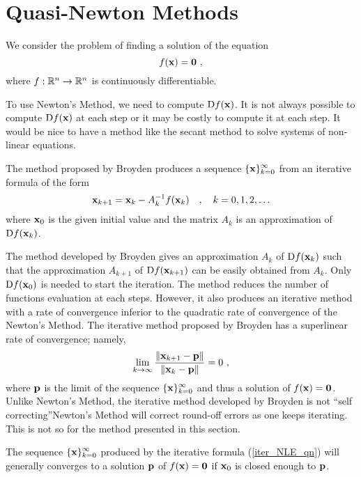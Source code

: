\section{Quasi-Newton Methods}

We consider the problem of finding a solution of the equation
\begin{equation}
f(\mathbf{x}) = \mathbf{0} \ ,
\end{equation}
where $f:\mathbb{R}^n \rightarrow \mathbb{R}^n$ is continuously differentiable.

To use Newton's Method, we need to compute $\mathrm{D} f(\mathbf{x})$.  It is
not always possible to compute $\mathrm{D} f(\mathbf{x})$ at each step or it may
be costly to compute it at each step.  It would be nice to have a
method like the secant method to solve systems of non-linear
equations.

The method proposed by Broyden produces a sequence
$\displaystyle \{ \mathbf{x} \}_{k=0}^\infty$ from an iterative formula of the
form
\begin{equation} \label{iter_NLE_qn}
\mathbf{x}_{k+1} = \mathbf{x}_k - A_k^{-1} f(\mathbf{x}_k) \quad , \quad k=0,1,2,\ldots
\end{equation}
where $\mathbf{x}_0$ is the given initial value and the matrix $A_k$ is an
approximation of $\mathrm{D} f(\mathbf{x}_k)$.

The method developed by Broyden gives an approximation $A_k$ of $\mathrm{D}
f(\mathbf{x}_k)$ such that the approximation $A_{k+1}$ 
of $\mathrm{D} f(\mathbf{x}_{k+1})$ can be easily obtained from $A_k$.  Only
$\mathrm{D} f(\mathbf{x}_0)$ is needed to start the iteration.
The method reduces the number of functions evaluation at
each steps.  However, it also produces an iterative method with a rate of
convergence inferior to the quadratic rate of convergence of the Newton's
Method.  The iterative method proposed by Broyden has a superlinear rate of
convergence; namely,
\[
\lim_{k\rightarrow \infty} \frac{\|\mathbf{x}_{k+1} - \mathbf{p}\|}
{\|\mathbf{x}_k - \mathbf{p}\|} = 0 \ ,
\]
where $\mathbf{p}$ is the limit of the sequence
$\displaystyle \{ \mathbf{x} \}_{k=0}^\infty$ and thus a solution of
$f(\mathbf{x})=\mathbf{0}$.
Unlike Newton's Method, the iterative method developed by Broyden is not
``self correcting''\quad  Newton's Method will correct round-off errors as one
keeps iterating.  This is not so for the method presented in this section.

The sequence $\displaystyle \{ \mathbf{x} \}_{k=0}^\infty$ produced by the 
iterative formula (\ref{iter_NLE_qn}) will generally converges to a solution
$\mathbf{p}$ of $f(\mathbf{x})=\mathbf{0}$ if $\mathbf{x}_0$ is closed enough to
$\mathbf{p}$.

